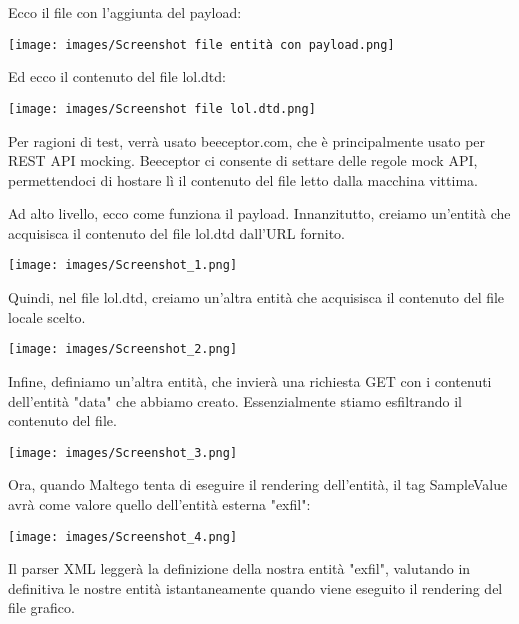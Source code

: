 \begin{flushleft}
Ecco il file con l'aggiunta del payload:
\end{flushleft}

\texttt{[image: images/Screenshot file entità con payload.png]}

\begin{flushleft}
Ed ecco il contenuto del file lol.dtd:
\end{flushleft}

\texttt{[image: images/Screenshot file lol.dtd.png]}

\begin{flushleft}
Per ragioni di test, verrà usato beeceptor.com, che è principalmente usato per REST API mocking. Beeceptor ci consente di settare delle regole mock API, permettendoci di hostare lì il contenuto del file letto dalla macchina vittima.
\end{flushleft}

\begin{flushleft}
Ad alto livello, ecco come funziona il payload. Innanzitutto, creiamo un'entità che acquisisca il contenuto del file lol.dtd dall'URL fornito.
\end{flushleft}

\texttt{[image: images/Screenshot\_1.png]}

\begin{flushleft}
Quindi, nel file lol.dtd, creiamo un'altra entità che acquisisca il contenuto del file locale scelto.
\end{flushleft}

\texttt{[image: images/Screenshot\_2.png]}

\begin{flushleft}
Infine, definiamo un'altra entità, che invierà una richiesta GET con i contenuti dell'entità "data" che abbiamo creato. Essenzialmente stiamo esfiltrando il contenuto del file.
\end{flushleft}

\texttt{[image: images/Screenshot\_3.png]}

\begin{flushleft}
Ora, quando Maltego tenta di eseguire il rendering dell'entità, il tag SampleValue avrà come valore quello dell'entità esterna "exfil":
\end{flushleft}

\texttt{[image: images/Screenshot\_4.png]}

\begin{flushleft}
Il parser XML leggerà la definizione della nostra entità "exfil", valutando in definitiva le nostre entità istantaneamente quando viene eseguito il rendering del file grafico.
\end{flushleft}

